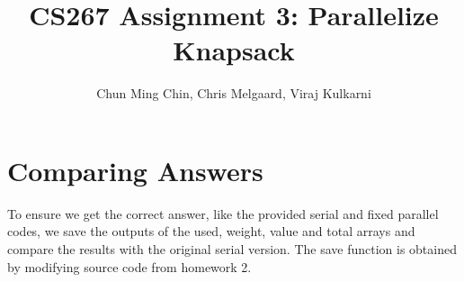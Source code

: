 \documentclass[11pt]{amsart}
\title{CS267 Assignment 3: Parallelize Knapsack}
\author{Chun Ming Chin, Chris Melgaard, Viraj Kulkarni }
\begin{document}
\maketitle


\section{Comparing Answers}

To ensure we get the correct answer, like the provided serial and fixed parallel codes, we save the outputs of the used, weight, value and total arrays and compare the results with the original serial version. The save function is obtained by modifying source code from homework 2.
\end{document}
